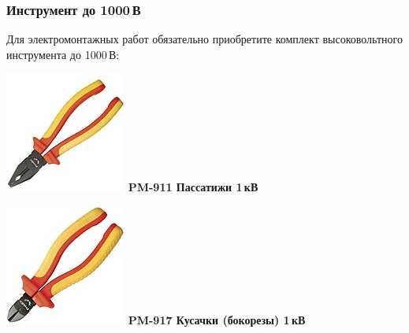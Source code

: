 \documentclass{magazine}
\begin{document}
\begin{multicols}{2}

\subsubsection{Инструмент до 1000\,В}

Для электромонтажных работ обязательно приобретите комплект
высоковольтного инструмента до 1000\,В:

\noindent\includegraphics[width=\columnwidth]{fig/00/pros/PM-911.jpg}
\textbf{PM-911 Пассатижи 1\,кВ}

\noindent\includegraphics[width=\columnwidth]{fig/00/pros/PM-917.jpg}
\textbf{PM-917 Кусачки (бокорезы) 1\,кВ}


\end{multicols}
\end{document}
